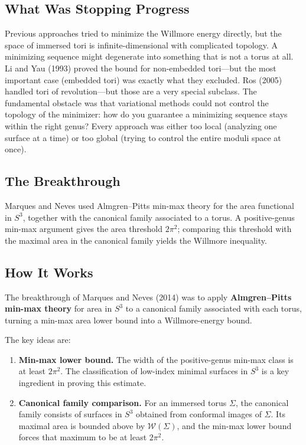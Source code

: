 \subsection{What Was Stopping Progress}

Previous approaches tried to minimize the Willmore energy directly, but the space of immersed tori is infinite-dimensional with complicated topology. A minimizing sequence might degenerate into something that is not a torus at all. Li and Yau (1993) proved the bound for non-embedded tori---but the most important case (embedded tori) was exactly what they excluded. Ros (2005) handled tori of revolution---but those are a very special subclass. The fundamental obstacle was that variational methods could not control the topology of the minimizer: how do you guarantee a minimizing sequence stays within the right genus? Every approach was either too local (analyzing one surface at a time) or too global (trying to control the entire moduli space at once).

\subsection{The Breakthrough}

Marques and Neves used Almgren--Pitts min-max theory for the area functional in $S^3$, together with the canonical family associated to a torus. A positive-genus min-max argument gives the area threshold $2\pi^2$; comparing this threshold with the maximal area in the canonical family yields the Willmore inequality.

\subsection{How It Works}

The breakthrough of Marques and Neves (2014) \cite{marquesneves2014} was to apply \textbf{Almgren--Pitts min-max theory} for area in $S^3$ to a canonical family associated with each torus, turning a min-max area lower bound into a Willmore-energy bound.

The key ideas are:

\begin{enumerate}
\item \textbf{Min-max lower bound.} The width of the positive-genus min-max class is at least $2\pi^2$. The classification of low-index minimal surfaces in $S^3$ is a key ingredient in proving this estimate.

\item \textbf{Canonical family comparison.} For an immersed torus $\Sigma$, the canonical family consists of surfaces in $S^3$ obtained from conformal images of $\Sigma$. Its maximal area is bounded above by $\mathcal{W}(\Sigma)$, and the min-max lower bound forces that maximum to be at least $2\pi^2$.

\end{enumerate}

